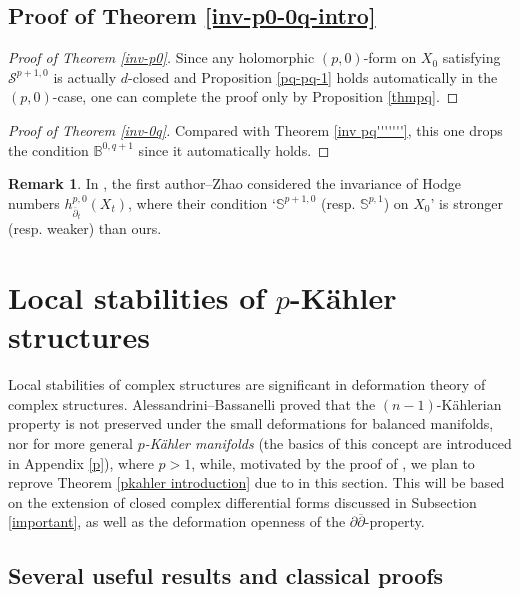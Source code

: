 \documentclass[12pt]{amsart}
\numberwithin{equation}{section}
\theoremstyle{definition}
\theoremstyle{definition}
\theoremstyle{definition}
\newtheorem{remark}  [theorem]     {Remark}
\renewcommand{\1}{\mathsf{1}}
\renewcommand{\>}{\rightarrow}
\newcommand{\p}{\partial}
\newcommand{\bp}{\overline\partial}
\def\p{\partial}
\def\mb{\mathbb}
\def\mc{\mathcal}
\theoremstyle{plain} %
\theoremstyle{plain} %
\theoremstyle{plain} %
\begin{document}
	
	
	
	\subsection{Proof of Theorem \ref{inv-p0-0q-intro}}\label{p00q-section}
	\begin{proof}[Proof of Theorem \ref{inv-p0}]
		Since any holomorphic $(p,0)$-form on $X_0$ satisfying $\mc S^{p+1,0}$ is actually $d$-closed and Proposition \ref{pq-pq-1} holds automatically in the $(p,0)$-case, one can complete the proof only by Proposition \ref{thmpq}.
	\end{proof}
	\begin{proof}[Proof of Theorem \ref{inv-0q}]
		Compared with Theorem \ref{inv pq'''''''}, this one drops the condition $\mathbb{B}^{0,q+1}$ since it automatically holds.
	\end{proof}
	
	\begin{remark}\label{Remark 2}
		In \cite[Theorem 3.18]{RZ18}, the first author--Zhao considered the invariance of
		Hodge numbers $h^{p,0}_{\bp_{t}}(X_t)$, where their condition `$\mb S^{p+1,0}$ (resp. $\mb S^{p,1}$) on $X_0$' is stronger (resp. weaker) than ours.
	\end{remark}
	
	
	\section{Local stabilities of $p$-K\"{a}hler structures}
	Local stabilities of complex structures are significant  in deformation theory of complex structures.  Alessandrini--Bassanelli \cite{AB90} proved that the $(n-1)$-K\"ahlerian property is not preserved under the small deformations for balanced manifolds, nor  for more general \textit{$p$-K\"ahler manifolds} (the basics of this concept are introduced in Appendix \ref{p}), where $p > 1$, while, motivated by the proof of \cite[Theorem 9.23]{Vo02}, we plan to reprove Theorem \ref{pkahler introduction} due to \cite{RWZ19} in this section. This will be based on the extension of closed complex differential forms discussed in Subsection \ref{important}, as well as  the deformation openness of the $\p\bp$-property.
	

	\subsection{Several useful results and classical proofs}\label{sus-introductionpkahler}
	
\end{document}
